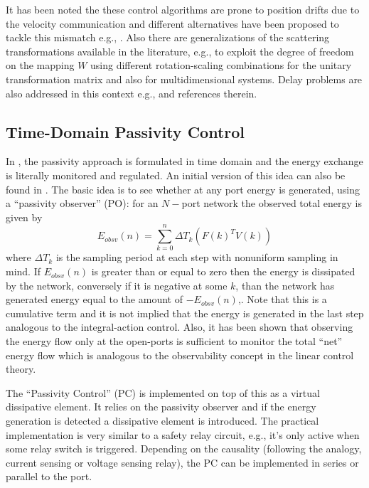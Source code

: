 It has been noted the these control algorithms are prone to position drifts due to the velocity communication and 
different alternatives have been proposed to tackle this mismatch e.g., \cite{yokokohji,chopratro06}. 
Also there are generalizations of the scattering transformations available in the literature, e.g., 
\cite{hirchebuss} to exploit the degree of freedom on the mapping $W$ using different rotation-scaling 
combinations for the unitary transformation matrix and also \cite{stramigioli} for multidimensional systems. 
Delay problems are also addressed in this context e.g., \cite{chopraberes,munirbook,nieslotine97,uedayoshikawa} 
and references therein. 



\subsection{Time-Domain Passivity Control}
In \cite{hannafordryu}, the passivity approach is formulated in time domain and the energy exchange is literally
monitored and regulated. An initial version of this idea can also be found in \cite{yokokohji}. The basic idea is 
to see whether at any port energy is generated, using a \enquote{passivity observer} (PO): for an $N-$port 
network the observed total energy is given by
\[
E_{obsv}(n) = \sum_{k=0}^n \Delta T_k(F(k)^TV(k))
\]
where $\Delta T_k$ is the sampling period at each step with nonuniform sampling in mind. If 
$E_{obsv}(n) $ is greater than or equal to zero then the energy is dissipated by the network, conversely if
it is negative at some $k$, than the network has generated energy equal to the amount of $-E_{obsv}(n)$,. Note that
this is a cumulative term and it is not implied that the energy is generated in the last step analogous to the 
integral-action control. Also, it has been shown that observing the energy flow only at the open-ports is 
sufficient to monitor the total \enquote{net} energy flow which is analogous to the observability concept in the 
linear control theory. 

The \enquote{Passivity Control} (PC) is implemented on top of this as a virtual dissipative element. It relies on the 
passivity observer and if the energy generation is detected a dissipative element is introduced. The practical 
implementation is very similar to a safety relay circuit, e.g., it's only active when some relay switch is 
triggered. Depending on the causality (following the analogy, current sensing or voltage sensing relay), the 
PC can be implemented in series or parallel to the port. 

